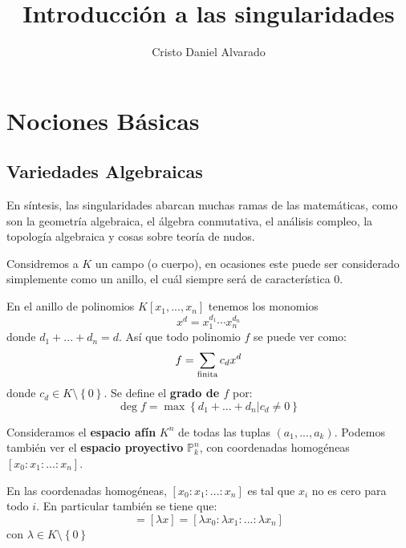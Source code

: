 \documentclass[12pt]{report}
\newcounter{it}
\theoremstyle{largebreak}
\begin{document}
    \setlength{\parskip}{5pt} %
    \setlength{\parindent}{12pt} %
    \title{Introducción a las singularidades}
    \author{Cristo Daniel Alvarado}
    \maketitle

    \tableofcontents %

    \chapter{Nociones Básicas}

    \section{Variedades Algebraicas}

    En síntesis, las singularidades abarcan muchas ramas de las matemáticas, como son la geometría algebraica, el álgebra conmutativa, el análisis compleo, la topología algebraica y cosas sobre teoría de nudos.
    
    Considremos a $K$ un campo (o cuerpo), en ocasiones este puede ser considerado simplemente como un anillo, el cuál siempre será de característica 0.

    En el anillo de polinomios $K[x_1,...,x_n]$ tenemos los monomios
    \begin{equation*}
        x^d=x_1^{d_1}\cdots x_n^{d_n}
    \end{equation*}
    donde $d_1+...+d_n=d$. Así que todo polinomio $f$ se puede ver como:
    \begin{equation*}
        f=\sum_{\textup{finita}}c_dx^d
    \end{equation*}
    donde $c_d\in K\setminus\left\{0 \right\}$. Se define el \textbf{grado de $f$} por:
    \begin{equation*}
        \deg f=\max\left\{d_1+...+d_n\Big|c_d\neq 0 \right\}
    \end{equation*}

    Consideramos el \textbf{espacio afín} $K^n$ de todas las tuplas $(a_1,...,a_k)$. Podemos también ver el \textbf{espacio proyectivo} $\mathbb{P}^n_k$, con coordenadas homogéneas $[x_0:x_1:...:x_n]$.

    \begin{obs}
        En las coordenadas homogéneas, $[x_0:x_1:...:x_n]$ es tal que $x_i$ no es cero para todo $i$. En particular también se tiene que:
        \begin{equation*}
            [x]=[\lambda x]=[\lambda x_0:\lambda x_1:...:\lambda x_n]
        \end{equation*}
        con $\lambda\in K\setminus\left\{ 0\right\}$
    \end{obs}
\end{document}
